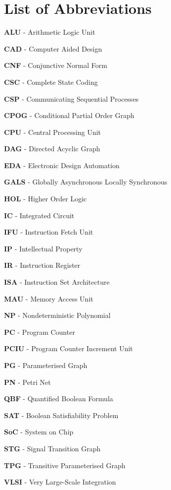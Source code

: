 \section*{List of Abbreviations}

\textbf{ALU} - Arithmetic Logic Unit

\textbf{CAD} - Computer Aided Design

\textbf{CNF} - Conjunctive Normal Form

\textbf{CSC} - Complete State Coding

\textbf{CSP} - Communicating Sequential Processes

\textbf{CPOG} - Conditional Partial Order Graph

\textbf{CPU} - Central Processing Unit

\textbf{DAG} - Directed Acyclic Graph

\textbf{EDA} - Electronic Design Automation

\textbf{GALS} - Globally Asynchronous Locally Synchronous

\textbf{HOL} - Higher Order Logic

\textbf{IC} - Integrated Circuit

\textbf{IFU} - Instruction Fetch Unit

\textbf{IP} - Intellectual Property

\textbf{IR} - Instruction Register

\textbf{ISA} - Instruction Set Architecture

\textbf{MAU} - Memory Access Unit

\textbf{NP} - Nondeterministic Polynomial

\textbf{PC} - Program Counter

\textbf{PCIU} - Program Counter Increment Unit

\textbf{PG} - Parameterised Graph

\textbf{PN} - Petri Net

\textbf{QBF} - Quantified Boolean Formula

\textbf{SAT} - Boolean Satisfiability Problem

\textbf{SoC} - System on Chip

\textbf{STG} - Signal Transition Graph

\textbf{TPG} - Transitive Parameterised Graph

\textbf{VLSI} - Very Large-Scale Integration

